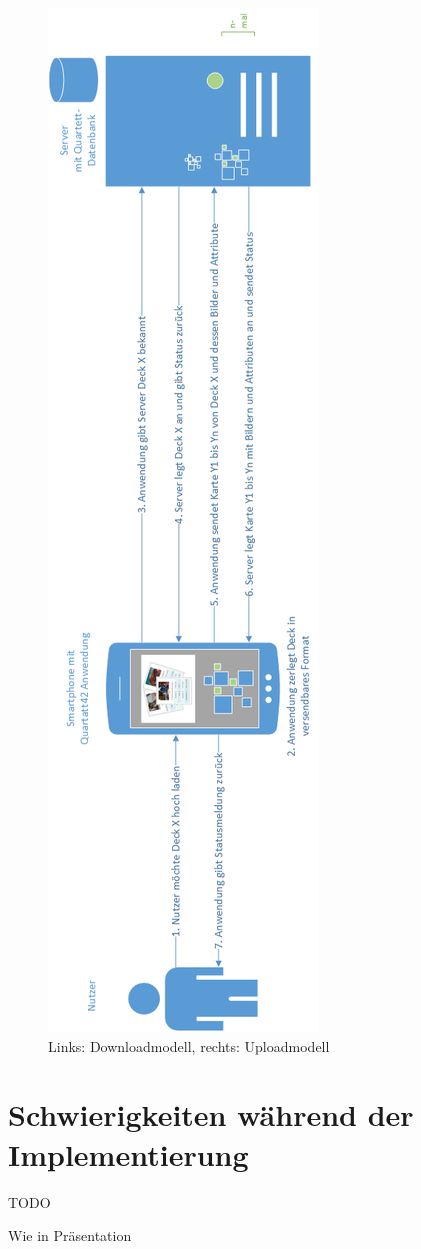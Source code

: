 \begin{figure}[htp]
\begin{minipage}{.45\textwidth}
\end{minipage}%
\begin{minipage}{.45\textwidth}
  \centering
  \includegraphics[width=.95\linewidth]{img/modelle/uploadmodell.png}
\end{minipage}%
\caption{Links: Downloadmodell, rechts: Uploadmodell }
\label{figure:implementierungdownundupload}
\end{figure}
\newpage

\section{Schwierigkeiten während der Implementierung}
\label{sec:implementierung:schwierigkeiten }	

TODO

Wie in Präsentation